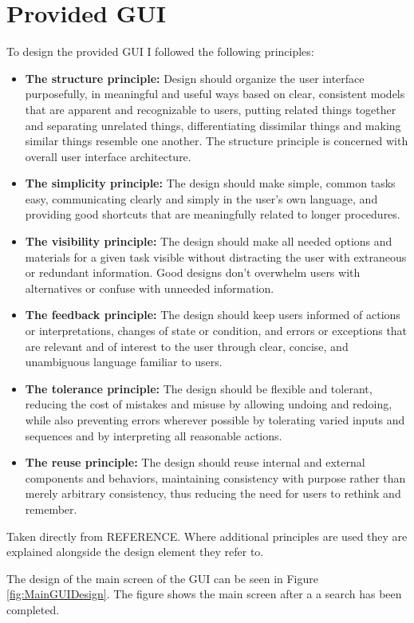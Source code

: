 \section{Provided GUI}
\label{sec:provgui}
To design the provided GUI I followed the following principles:
\begin{itemize}
 \item \textbf{The structure principle:} Design should organize the user interface purposefully, in meaningful and useful ways based on clear, consistent models that are apparent and recognizable to users, putting related things together and separating unrelated things, differentiating dissimilar things and making similar things resemble one another. 
The structure principle is concerned with overall user interface architecture.
\item \textbf{The simplicity principle:} The design should make simple, common tasks easy, communicating clearly and simply in the user's own language, and providing good shortcuts that are meaningfully related to longer procedures.
\item \textbf{The visibility principle:} The design should make all needed options and materials for a given task visible without distracting the user with extraneous or redundant information. 
Good designs don't overwhelm users with alternatives or confuse with unneeded information.
\item \textbf{The feedback principle:} The design should keep users informed of actions or interpretations, changes of state or condition, and errors or exceptions that are relevant and of interest to the user through clear, concise, and unambiguous language familiar to users.
\item \textbf{The tolerance principle:} The design should be flexible and tolerant, reducing the cost of mistakes and misuse by allowing undoing and redoing, while also preventing errors wherever possible by tolerating varied inputs and sequences and by interpreting all reasonable actions.
\item \textbf{The reuse principle:} The design should reuse internal and external components and behaviors, maintaining consistency with purpose rather than merely arbitrary consistency, thus reducing the need for users to rethink and remember.
\end{itemize}
Taken directly from REFERENCE.
Where additional principles are used they are explained alongside the design element they refer to.

The design of the main screen of the GUI can be seen in Figure \ref{fig:MainGUIDesign}.
The figure shows the main screen after a a search has been completed.

